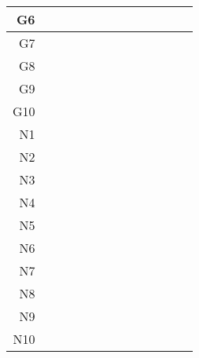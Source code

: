 \begin{center}
\begin{tabular}{r|r|r|r|r|r|r|r|r|r|r|r|r}
        G6  &  &  &  &  &  &  &  &  &  &  &  \\\hline
        G7  &  &  &  &  &\x&  &  &  &  &  &  \\\hline
        G8  &  &  &  &\x&\x&  &  &\x&  &\x&  \\\hline
        G9  &\x&\x&\x&\x&\x&\x&\x&\x&\x&\x&\x\\\hline
        G10 &\x&\x&\x&\x&\x&\x&\x&\x&\x&\x&\x\\\hline
        \hline
        N1  &  &  &  &  &  &  &  &  &  &  &  \\\hline
        N2  &  &  &  &  &  &  &  &  &  &  &  \\\hline
        N3  &  &  &  &  &  &  &  &  &  &  &  \\\hline
        N4  &  &  &  &  &  &  &  &  &  &  &  \\\hline
        N5  &  &  &  &  &  &  &  &  &  &  &  \\\hline
        N6  &  &  &  &  &  &  &  &  &  &  &  \\\hline
        N7  &  &  &  &  &  &  &  &\x&  &\x&  \\\hline
        N8  &  &  &  &  &\x&  &  &\x&\x&\x&\x\\\hline
        N9  &\x&\x&\x&\x&\x&\x&\x&\x&\x&\x&\x\\\hline
        N10 &\x&\x&\x&\x&\x&\x&\x&\x&\x&\x&\x
    \end{tabular}

\end{center}
